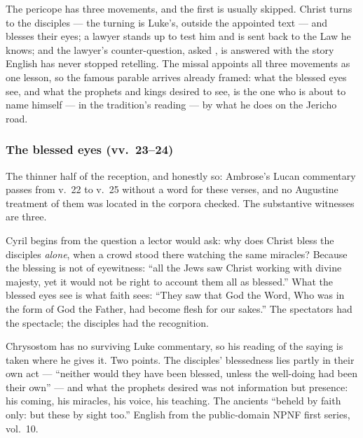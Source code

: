 
The pericope has three movements, and the first is usually skipped. Christ
turns to the disciples --- the turning is Luke's, outside the appointed text
--- and blesses their eyes; a lawyer stands up to test him and is sent back to
the Law he knows; and the lawyer's counter-question, asked , is answered with the story English has never stopped
retelling. The missal appoints all three movements as one lesson, so the
famous parable arrives already framed: what the blessed eyes see, and what the
prophets and kings desired to see, is the one who is about to name himself ---
in the tradition's reading --- by what he does on the Jericho road.

\subsubsection*{The blessed eyes (vv.~23--24)}

The thinner half of the reception, and honestly so: Ambrose's Lucan
commentary passes from v.~22 to v.~25 without a word for these verses, and no
Augustine treatment of them was located in the corpora checked. The
substantive witnesses are three.

\begin{witnessnote}
Cyril begins from the question a lector would ask: why does Christ bless the
disciples \textit{alone}, when a crowd stood there watching the same miracles?
Because the blessing is not of eyewitness: ``all the Jews saw Christ working
with divine majesty, yet it would not be right to account them all as
blessed.'' What the blessed eyes see is what faith sees: ``They saw that God
the Word, Who was in the form of God the Father, had become flesh for our
sakes.'' The spectators had the spectacle; the disciples had the recognition.
\end{witnessnote}

\begin{witnessnote}
Chrysostom has no surviving Luke commentary, so his reading of the saying is
taken where he gives it. Two points. The disciples' blessedness lies partly in
their own act --- ``neither would they have been blessed, unless the
well-doing had been their own'' --- and what the prophets desired was not
information but presence: his coming, his miracles, his voice, his teaching.
The ancients ``beheld by faith only: but these by sight too.'' English from
the public-domain NPNF first series, vol.~10.
\end{witnessnote}


